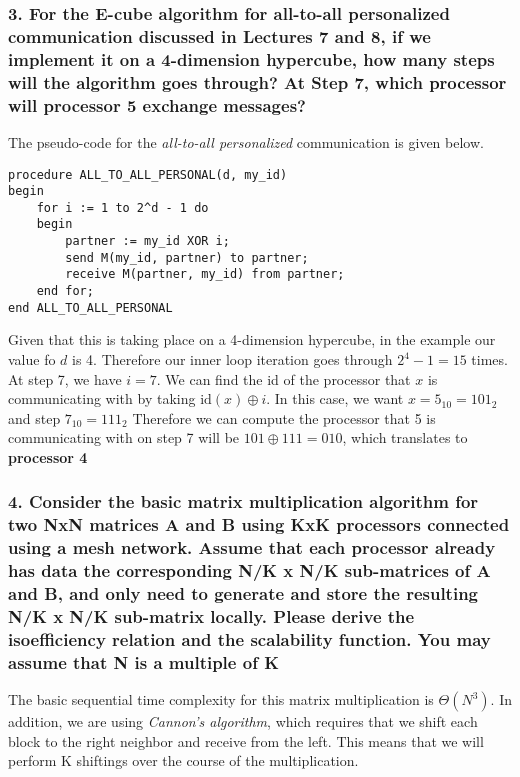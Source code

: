 \documentclass[titlepage]{article}
\begin{document}
\subsubsection*{3. For the E-cube algorithm for all-to-all personalized 
communication discussed in Lectures 7 and 8, if we implement it on a 
4-dimension hypercube, how many steps will the algorithm goes through? At Step
7, which processor will processor 5 exchange messages?}
The pseudo-code for the \textit{all-to-all personalized} communication is given
below.
\begin{verbatim}
procedure ALL_TO_ALL_PERSONAL(d, my_id)
begin
    for i := 1 to 2^d - 1 do
    begin
        partner := my_id XOR i;
        send M(my_id, partner) to partner;
        receive M(partner, my_id) from partner;
    end for;
end ALL_TO_ALL_PERSONAL
\end{verbatim}
Given that this is taking place on a 4-dimension hypercube, in the example our
value fo $d$ is 4. Therefore our inner loop iteration goes through 
$2^4 - 1 = 15$ times. At step 7, we have $i=7$. We can find the id of the
processor that $x$ is communicating with by taking $\textrm{id}(x) \oplus i$.
In this case, we want $x= 5_{10} = 101_2$ and step $7_{10} = 111_2$ Therefore
we can compute the processor that 5 is communicating with on step 7 will be
$101 \oplus 111 = 010$, which translates to \textbf{processor 4}
\subsubsection*{4. Consider the basic matrix multiplication algorithm for two
NxN matrices A and B using KxK processors connected using a mesh network. 
Assume that each processor already has data the corresponding N/K x N/K 
sub-matrices of A and B, and only need to generate and store the resulting N/K
x N/K sub-matrix locally. Please derive the isoefficiency relation and the
scalability function. You may assume that N is a multiple of K}
The basic sequential time complexity for this matrix multiplication is 
$\Theta(N^3)$. In addition, we are using \textit{Cannon's algorithm}, which
requires that we shift each block to the right neighbor and receive from the
left. This means that we will perform K shiftings over the course of the
multiplication. 
\end{document}
